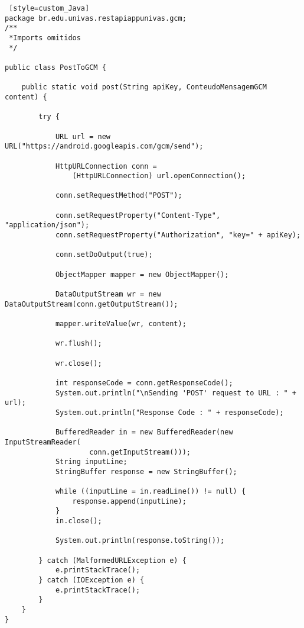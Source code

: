 \begin{lstlisting} [style=custom_Java]
package br.edu.univas.restapiappunivas.gcm;
/**
 *Imports omitidos
 */

public class PostToGCM {

	public static void post(String apiKey, ConteudoMensagemGCM content) {

		try {

			URL url = new URL("https://android.googleapis.com/gcm/send");

			HttpURLConnection conn = 
				(HttpURLConnection) url.openConnection();

			conn.setRequestMethod("POST");

			conn.setRequestProperty("Content-Type", "application/json");
			conn.setRequestProperty("Authorization", "key=" + apiKey);

			conn.setDoOutput(true);

			ObjectMapper mapper = new ObjectMapper();

			DataOutputStream wr = new DataOutputStream(conn.getOutputStream());

			mapper.writeValue(wr, content);

			wr.flush();

			wr.close();

			int responseCode = conn.getResponseCode();
			System.out.println("\nSending 'POST' request to URL : " + url);
			System.out.println("Response Code : " + responseCode);

			BufferedReader in = new BufferedReader(new InputStreamReader(
					conn.getInputStream()));
			String inputLine;
			StringBuffer response = new StringBuffer();

			while ((inputLine = in.readLine()) != null) {
				response.append(inputLine);
			}
			in.close();

			System.out.println(response.toString());

		} catch (MalformedURLException e) {
			e.printStackTrace();
		} catch (IOException e) {
			e.printStackTrace();
		}
	}
}


\end{lstlisting}
